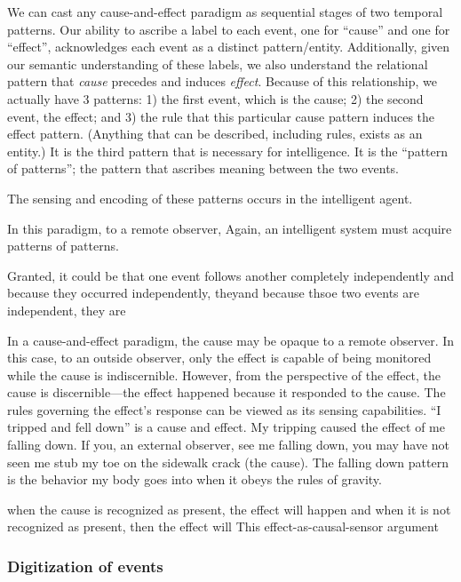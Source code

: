 We can cast any cause-and-effect paradigm as sequential stages of two temporal patterns.
Our ability to ascribe a label to each event, one for ``cause'' and one for ``effect'', acknowledges each event as a distinct pattern/entity.
Additionally, given our semantic understanding of these labels, we also understand the relational pattern that \emph{cause} precedes and induces \emph{effect}.
Because of this relationship, we actually have 3 patterns: 1) the first event, which is the cause; 2) the second event, the effect; and 3) the rule that this particular cause pattern induces the effect pattern.
(Anything that can be described, including rules, exists as an entity.)
It is the third pattern that is necessary for intelligence.
It is the ``pattern of patterns''; the pattern that ascribes meaning between the two events.

The sensing and encoding of these patterns occurs in the intelligent agent.


In this paradigm, to a remote observer, 
Again, an intelligent system must acquire patterns of patterns.


Granted, it could be that one event follows another completely independently and because they occurred independently, theyand because thsoe two events are independent, they are 


In a cause-and-effect paradigm, the cause may be opaque to a remote observer.
In this case, to an outside observer, only the effect is capable of being monitored while the cause is indiscernible.
However, from the perspective of the effect, the cause is discernible---the effect happened because it responded to the cause.
The rules governing the effect's response can be viewed as its sensing capabilities.
``I tripped and fell down'' is a cause and effect.
My tripping caused the effect of me falling down.
If you, an external observer, see me falling down, you may have not seen me stub my toe on the sidewalk crack (the cause).
The falling down pattern is the behavior my body goes into when it obeys the rules of gravity. 

when the cause is recognized as present, the effect will happen and when it is not recognized as present, then the effect will 
This effect-as-causal-sensor argument 
\subsubsection{Digitization of events}





